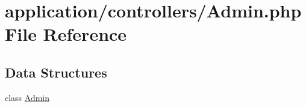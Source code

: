 \hypertarget{_admin_8php}{}\section{application/controllers/\+Admin.php File Reference}
\label{_admin_8php}
\subsection*{Data Structures}
\begin{DoxyCompactItemize}
\item 
class \mbox{\hyperlink{class_admin}{Admin}}
\end{DoxyCompactItemize}
